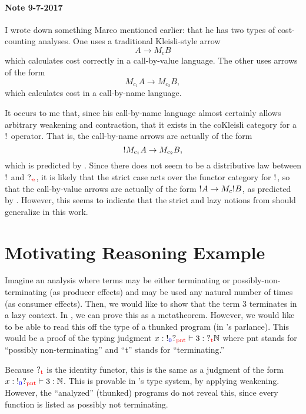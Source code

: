 \documentclass{article}
\newcommand{\proves}{\vdash}
\newcommand{\consgrade}[1]{\textcolor{blue}{#1}}
\newcommand{\prodgrade}[1]{\textcolor{red}{#1}}
\newcommand{\bangg}[1]{\mathord{!_{\consgrade{#1}}}}
\newcommand{\queryg}[1]{\mathord{?_{\prodgrade{#1}}}}
\newcommand{\bang}{\bangg{}}
\begin{document}
\paragraph{Note 9-7-2017}
I wrote down something Marco mentioned earlier: that he has two types of cost-counting analyses.
One uses a traditional Kleisli-style arrow $$A \to M_c B$$ which calculates cost correctly in a call-by-value language. 
The other uses arrows of the form $$M_{c_1} A \to M_{c_2} B,$$ which calculates cost in a call-by-name language.

It occurs to me that, since his call-by-name language almost certainly allows arbitrary weakening and contraction, that it exists in the coKleisli category for a $\bang$ operator.
That is, the call-by-name arrows are actually of the form $$\bang M_{c_1} A \to M_{c_2} B,$$ which is predicted by \citet{Hirsch}.
Since there does not seem to be a distributive law between $\bang$ and $\queryg{n}$, it is likely that the strict case acts over the functor category for $\bang$, so that the call-by-value arrows are actually of the form $\bang A \to M_{c}\bang B$, as predicted by \citet{Hirsch}.
However, this seems to indicate that the strict and lazy notions from \citet{Hirsch} should generalize in this work.

\section{Motivating Reasoning Example}

Imagine an analysis where terms may be either terminating or possibly-non-terminating (as producer effects) and may be used any natural number of times (as consumer effects).
Then, we would like to show that the term $3$ terminates in a lazy context.
In \citet{Hirsch}, we can prove this as a metatheorem.
However, we would like to be able to read this off the type of a thunked program (in \citet{Hirsch}'s parlance).
This would be a proof of the typing judgment $x : \bangg{0}\queryg{\mathrm{pnt}} \proves 3 : \queryg{\mathrm{t}} \mathbb{N}$ where pnt stands for ``possibly non-terminating'' and ``t'' stands for ``terminating.''

Because $\queryg{\mathrm{t}}$ is the identity functor, this is the same as a judgment of the form $x : \bangg{0}\queryg{\mathrm{pnt}} \proves 3 : \mathbb{N}$.
This is provable in \citet{Hirsch}'s type system, by applying weakening.
However, the ``analyzed'' (thunked) programs do not reveal this, since every function is listed as possibly not terminating.
\end{document}
